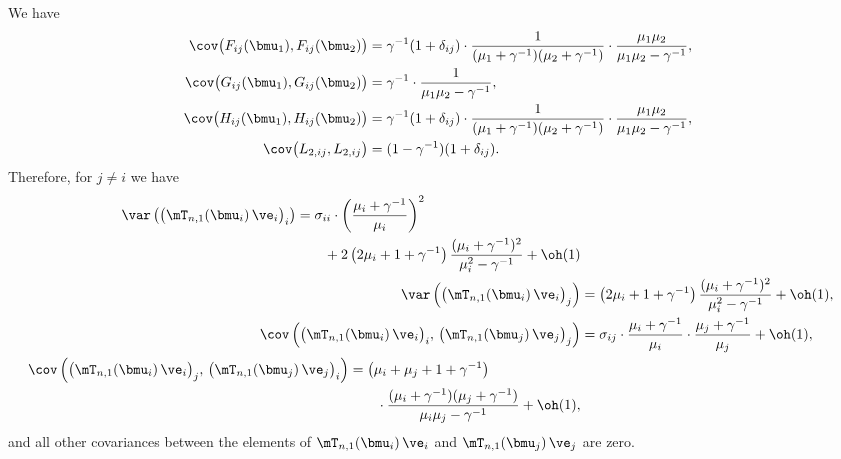 We have
\begin{align*}
    \cov\big( F_{ij} ( \bmu_1 ), F_{ij} ( \bmu_2 ) \big)
        &= 
        \gamma^{-1} ( 1 + \delta_{ij} )
        \cdot
        \frac{1}{ ( \mu_1 + \gamma^{-1} ) ( \mu_2 + \gamma^{-1} ) }
        \cdot
        \frac{ \mu_1 \mu_2 }{ \mu_1 \mu_2 - \gamma^{-1} }, \\
    \cov\big( G_{ij} ( \bmu_1 ), G_{ij} ( \bmu_2 ) \big)
        &= 
        \gamma^{-1} 
        \cdot
        \frac{1}{ \mu_1 \mu_2 - \gamma^{-1} }, \\
    \cov\big( H_{ij} ( \bmu_1 ), H_{ij} ( \bmu_2 ) \big)
        &= 
        \gamma^{-1} ( 1 + \delta_{ij} )
        \cdot
        \frac{1}{ ( \mu_1 + \gamma^{-1} ) ( \mu_2 + \gamma^{-1} ) }
        \cdot
        \frac{ \mu_1 \mu_2 }{ \mu_1 \mu_2 - \gamma^{-1} }, \\
    \cov\big( L_{2,ij}, L_{2,ij} \big)
        &=
        (1 - \gamma^{-1}) (1 + \delta_{ij}).
\end{align*}
Therefore, for $j \neq i$ we have
\begin{align*}
    \begin{split}
    \var \left(
        \big(
            \mT_{n,1}( \bmu_i ) \,
            \ve_i
        \big)_i
    \right)
        &= 
        \sigma_{ii}
        \cdot
        \left(
            \frac{\mu_i + \gamma^{-1}}{\mu_i}
        \right)^2 \\
        &\qquad+
        2
        \left(
            2 \mu_i + 1 + \gamma^{-1}
        \right)
        \frac{ (\mu_i + \gamma^{-1})^2 }
             { \mu_i^2 - \gamma^{-1} } + \oh(1)
    \end{split} \\
    \var \left(
        \big(
            \mT_{n,1}( \bmu_i ) \,
            \ve_i
        \big)_j
    \right)
        &=
        \left(
            2 \mu_i + 1 + \gamma^{-1}
        \right)
        \frac{ (\mu_i + \gamma^{-1})^2 }
             { \mu_i^2 - \gamma^{-1} } + \oh(1), \\
    \cov \left( 
        \big(
            \mT_{n,1}( \bmu_i ) \,
            \ve_i
        \big)_i, \,
        \big(
            \mT_{n,1}( \bmu_j ) \,
            \ve_j
        \big)_j
    \right)
        &=
        \sigma_{ij}
        \cdot
        \frac{\mu_i + \gamma^{-1}}{ \mu_i }
        \cdot
        \frac{\mu_j + \gamma^{-1}}{ \mu_j } + \oh(1), \\
    \begin{split}
    \cov \left(
        \big(
            \mT_{n,1}( \bmu_i ) \,
            \ve_i
        \big)_j, \,
        \big(
            \mT_{n,1}( \bmu_j ) \,
            \ve_j
        \big)_i    
    \right)
        &=
        \left(
            \mu_i + \mu_j + 1 + \gamma^{-1}
        \right) \\
        &\qquad \cdot
            \frac{ ( \mu_i + \gamma^{-1} )( \mu_j + \gamma^{-1} ) }
                 { \mu_i \mu_j - \gamma^{-1} }
        + \oh(1),
    \end{split}
\end{align*}
and all other covariances between the elements of
$\mT_{n,1}(\bmu_i) \, \ve_i$ and $\mT_{n,1}(\bmu_j) \, \ve_j$ are zero.

